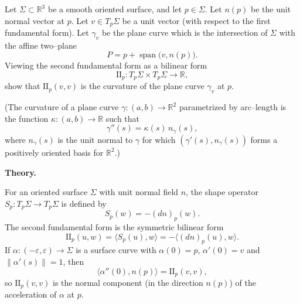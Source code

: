 \begin{problem}
\label{prob:cp-vii-0045}
Let $\Sigma\subset\mathbb{R}^3$ be a smooth oriented surface, and let $p\in\Sigma$.
	Let $n(p)$ be the unit normal vector at $p$.  Let $v\in T_p\Sigma$ be a unit
	vector (with respect to the first fundamental form).  Let $\gamma_v$ be the
	plane curve which is the intersection of $\Sigma$ with the affine two--plane
	\[
	P = p + \operatorname{span}\bigl(v,n(p)\bigr).
	\]
	Viewing the second fundamental form as a bilinear form
	\[
	\mathrm{II}_p : T_p\Sigma\times T_p\Sigma\to\mathbb{R},
	\]
	show that $\mathrm{II}_p(v,v)$ is the curvature of the plane curve $\gamma_v$
	at $p$.
	
	(The curvature of a plane curve
	$\gamma:(a,b)\to\mathbb{R}^2$ parametrized by arc--length is the function
	$\kappa:(a,b)\to\mathbb{R}$ such that
	\[
	\gamma''(s)=\kappa(s)\,n_\gamma(s),
	\]
	where $n_\gamma(s)$ is the unit normal to $\gamma$ for which
	$(\gamma'(s),n_\gamma(s))$ forms a positively oriented basis for $\mathbb{R}^2$.)
	
	\par\medskip\noindent\textbf{Theory.}\par\smallskip

	For an oriented surface $\Sigma$ with unit normal field $n$, the shape operator
	$S_p:T_p\Sigma\to T_p\Sigma$ is defined by
	\[
	S_p(w) = - (dn)_p(w).
	\]
	The second fundamental form is the symmetric bilinear form
	\[
	\mathrm{II}_p(u,w) = \langle S_p(u),w\rangle
	= -\langle (dn)_p(u),w\rangle.
	\]
	If $\alpha:(-\varepsilon,\varepsilon)\to\Sigma$ is a surface curve with
	$\alpha(0)=p$, $\alpha'(0)=v$ and $\|\alpha'(s)\|=1$, then
	\[
	\langle \alpha''(0),n(p)\rangle = \mathrm{II}_p(v,v),
	\]
	so $\mathrm{II}_p(v,v)$ is the normal component (in the direction $n(p)$) of
	the acceleration of $\alpha$ at $p$.
\end{problem}

